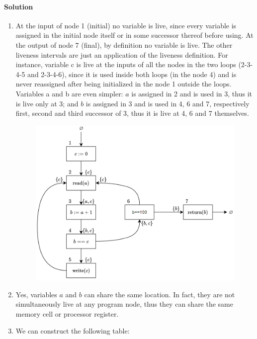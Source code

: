 \paragraph*{Solution}
\begin{enumerate}
    \item At the input of node 1 (initial) no variable is live, since every variable is assigned in the initial node itself or in some successor thereof before using.
        At the output of node 7 (final), by definition no variable is live. The other liveness intervals are just an application of the liveness definition. 
        For instance, variable c is live at the inputs of all the nodes in the two loops (2-3-4-5 and 2-3-4-6), since it is used inside both loops (in the node 4) 
        and is never reassigned after being initialized in the node 1 outside the loops. Variables a and b are even simpler: $a$ is assigned in 2 and is used in 3,
        thus it is live only at 3; and $b$ is assigned in 3 and is used in 4, 6 and 7, respectively first, second and third successor of 3, thus it is live at 4, 6 
        and 7 themselves.
        \begin{figure}[H]
            \centering
            \includegraphics[width=0.75\linewidth]{images/CFGlive.png}
        \end{figure} 
    \item Yes, variables $a$ and $b$ can share the same location. In fact, they are not simultaneously live at any program node, thus they can share the same 
        memory cell or processor register.
    \item We can construct the following table: 
        \begin{table}[H]
            \centering
            \begin{tabular}{l|c|c|}
            \cline{2-3}

\end{tabular}
\end{table}
\end{enumerate}
